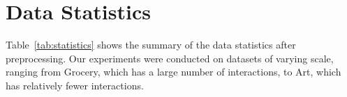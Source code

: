 \documentclass[sigconf]{acmart}
\begin{document}
\begin{table}[h]
\caption{Data statistics after preprocessing.}
\vspace{-2.5ex}
\label{tab:statistics}
\vspace{-2ex}
\end{table}



\section{Data Statistics}
\label{app_sec:data_statistics}
Table~\ref{tab:statistics} shows the summary of the data statistics after preprocessing. Our experiments were conducted on datasets of varying scale, ranging from Grocery, which has a large number of interactions, to Art, which has relatively fewer interactions.
\end{document}
